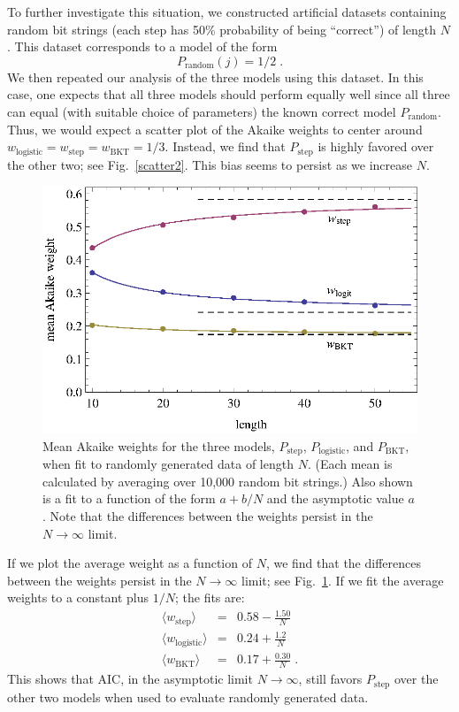 \documentclass{acmlarge-edm}
\begin{document}
To further investigate this situation, we constructed
artificial datasets containing random bit strings (each
step has 50\% probability of being ``correct'') of length $N$.
This dataset corresponds to a model of the form
%
\begin{equation}
        P_\mathrm{random}(j)=1/2 \; .
\end{equation}
%
We then repeated our analysis of the three models using this dataset.
In this case, one expects that all three models should perform equally
well since all three can equal (with suitable choice of parameters)
the known correct model $P_\mathrm{random}$.  Thus, we would expect
a scatter plot of the Akaike weights to center around
$w_\mathrm{logistic}=w_\mathrm{step}=w_\mathrm{BKT}=1/3$.  Instead, we
find that $P_\mathrm{step}$ is highly favored over the other two; see
Fig.~\ref{scatter2}. This bias seems to persist as we increase $N$.

\begin{figure}
   \centering\includegraphics{mean-weights.eps}
  \caption{Mean Akaike weights for the three models, 
   $P_\mathrm{step}$, $P_\mathrm{logistic}$, and $P_\mathrm{BKT}$, 
   when fit to randomly generated data of length $N$.
   (Each mean is calculated by averaging over 10,000 random bit strings.)
   Also shown is a fit to a function of the form $a+b/N$ and the
   asymptotic value $a$.
   Note that the differences between the weights persist
   in the $N\to\infty$ limit.}\label{meanweight}
\end{figure}

If we plot the average weight as a function of $N$, we find
that the differences between the weights persist
in the $N\to\infty$ limit;  see Fig.~\ref{meanweight}.
If we fit the average weights to a constant plus $1/N$;
the fits are:
%
\begin{eqnarray}
 \langle w_\mathrm{step}\rangle &=& 0.58 - \frac{1.50}{N} \\
 \langle w_\mathrm{logistic}\rangle &=& 0.24 + \frac{1.2}{N} \\
 \langle w_\mathrm{BKT}\rangle &=& 0.17+\frac{0.30}{N} \; .
\end{eqnarray}
%
This shows that AIC, in the asymptotic limit $N\to\infty$, 
still favors  $P_\mathrm{step}$ over the other two models
when used to evaluate randomly generated data.
\end{document}
